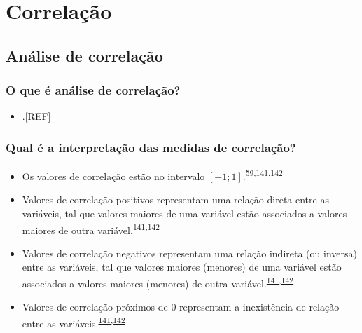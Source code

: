 \documentclass[
  a4paper,
]{book}
\providecommand{\tightlist}{%
  \setlength{\itemsep}{0pt}\setlength{\parskip}{0pt}}
\begin{document}
\hypertarget{analise-inferencial-correlacao}{%
\chapter{\texorpdfstring{\textbf{Correlação}}{Correlação}}\label{analise-inferencial-correlacao}}

\hypertarget{analise-correlacao}{%
\section{Análise de correlação}\label{analise-correlacao}}

\hypertarget{o-que-uxe9-anuxe1lise-de-correlauxe7uxe3o}{%
\subsection{O que é análise de correlação?}\label{o-que-uxe9-anuxe1lise-de-correlauxe7uxe3o}}

\begin{itemize}
\tightlist
\item
  .{[}REF{]}
\end{itemize}

\hypertarget{qual-uxe9-a-interpretauxe7uxe3o-das-medidas-de-correlauxe7uxe3o}{%
\subsection{Qual é a interpretação das medidas de correlação?}\label{qual-uxe9-a-interpretauxe7uxe3o-das-medidas-de-correlauxe7uxe3o}}

\begin{itemize}
\item
  Os valores de correlação estão no intervalo \([-1; 1]\).\textsuperscript{\protect\hyperlink{ref-barkan2015}{59},\protect\hyperlink{ref-khamis2008}{141},\protect\hyperlink{ref-allison2022}{142}}
\item
  Valores de correlação positivos representam uma relação direta entre as variáveis, tal que valores maiores de uma variável estão associados a valores maiores de outra variável.\textsuperscript{\protect\hyperlink{ref-khamis2008}{141},\protect\hyperlink{ref-allison2022}{142}}
\item
  Valores de correlação negativos representam uma relação indireta (ou inversa) entre as variáveis, tal que valores maiores (menores) de uma variável estão associados a valores maiores (menores) de outra variável.\textsuperscript{\protect\hyperlink{ref-khamis2008}{141},\protect\hyperlink{ref-allison2022}{142}}
\item
  Valores de correlação próximos de \(0\) representam a inexistência de relação entre as variáveis.\textsuperscript{\protect\hyperlink{ref-khamis2008}{141},\protect\hyperlink{ref-allison2022}{142}}
\end{itemize}
\end{document}

